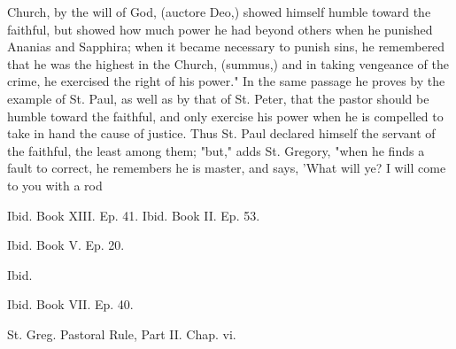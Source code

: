 Church, by the will of God, (auctore Deo,) showed himself humble toward the faithful, but showed how much power he had beyond others when he punished Ananias and Sapphira; when it became necessary to punish sins, he remembered that he was the highest in the Church, (summus,) and in taking vengeance of the crime, he exercised the right of his power." In the same passage he proves by the example of St. Paul, as well as by that of St. Peter, that the pastor should be humble toward the faithful, and only exercise his power when he is compelled to take in hand the cause of justice. Thus St. Paul declared himself the servant of the faithful, the least among them; "but," adds St. Gregory, "when he finds a fault to correct, he remembers he is master, and says, 'What will ye? I will come to you with a rod

Ibid. Book XIII. Ep. 41. Ibid. Book II. Ep. 53.

Ibid. Book V. Ep. 20.

Ibid.

Ibid. Book VII. Ep. 40.

St. Greg. Pastoral Rule, Part II. Chap. vi.

